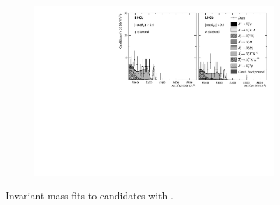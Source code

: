 \begin{figure}[!h]
\begin{subfigure}[t]{1.0\textwidth}
    \end{subfigure}
    \begin{subfigure}[t]{1.0\textwidth}
        \centering
        \includegraphics[width=1.0\textwidth]{figs/Appendix_FitCategories/canvas_DsPhiSide_Ds2PhiPi_both_summed_splitHel_splitKKPi_s21_s21r1_s24_s26.pdf}\\
    \end{subfigure}
    \caption{Invariant mass fits to \decay{\Bp}{\Dsp\phiz} candidates with \decay{\Dsp}{\phiz\pip}.}
    \label{fig:app_fit_phi}
\end{figure}

